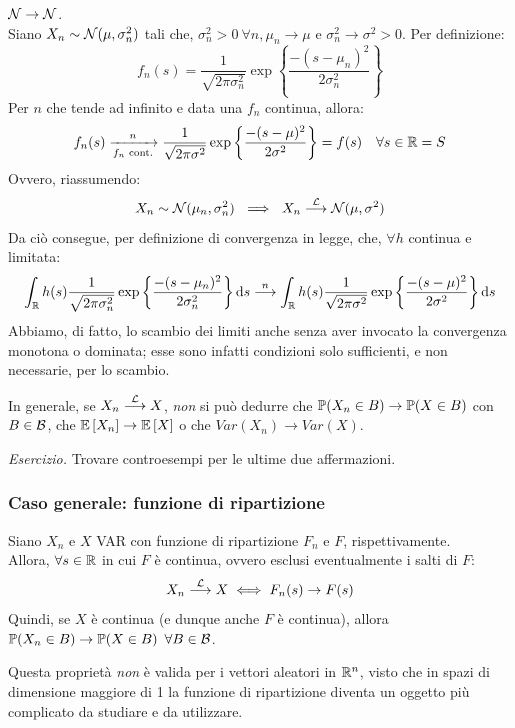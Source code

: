 \medskip
\begin{ese}
  $\mathcal N \to \mathcal N$. \\
  Siano $X_n \sim \mathcal N(\mu,\sigma_n^2)$ tali che, $\sigma_n^2 > 0 \ \forall n, \mu_n \to \mu$ e $\sigma_n^2 \to \sigma^2 > 0$. Per definizione:
  $$f_n(s) = \frac 1 {\sqrt{2 \pi \sigma_n^2}} \exp\left\{ \frac{-(s-\mu_n)^2}{2\sigma_n^2} \right\}$$
  Per $n$ che tende ad infinito e data una $f_n$ continua, allora:
  $$f_n(s) \xrightarrow[f_n \text{ cont.}]{n} \frac 1 {\sqrt{2 \pi \sigma^2}} \exp\left\{ \frac{-(s-\mu)^2}{2\sigma^2} \right\} = f(s) \quad \forall s \in \mathbb R = S$$
  Ovvero, riassumendo:
  $$ X_n \sim \mathcal N(\mu_n,\sigma_n^2) \ \implies \ X_n \stackrel{\mathcal L}{\longrightarrow} \mathcal N(\mu,\sigma^2) $$
  Da ciò consegue, per definizione di convergenza in legge, che, $\forall h$ continua e limitata:
  $$ \int_\mathbb R h(s) \frac 1 {\sqrt{2 \pi \sigma_n^2}} \exp\left\{ \frac{-(s-\mu_n)^2}{2\sigma_n^2} \right\} \mathrm d s \overset{n}{\longrightarrow}
  \int_\mathbb R h(s)  \frac 1 {\sqrt{2 \pi \sigma^2}} \exp\left\{ \frac{-(s-\mu)^2}{2\sigma^2} \right\} \mathrm d s$$
  Abbiamo, di fatto, lo scambio dei limiti anche senza aver invocato la convergenza monotona o dominata; esse sono infatti condizioni solo sufficienti, e non necessarie, per lo scambio.
\end{ese}

In generale, se $X_n \stackrel{\mathcal L}{\longrightarrow} X$, \emph{non} si può dedurre che $\mathbb P(X_n \in B) \to \mathbb P(X \in B)$ con $B \in \mathcal B$, che $\mathbb E \left[ X_n \right] \to \mathbb E \left[ X \right]$ o che $Var(X_n) \to Var(X)$.


\textit{Esercizio.} Trovare controesempi per le ultime due affermazioni.

\subsubsection{Caso generale: funzione di ripartizione}
\begin{teob}[\JPTh{18.4}]
  Siano $X_n$ e $X$ VAR con funzione di ripartizione $F_n$ e $F$, rispettivamente. \\
  Allora, $\forall s \in \mathbb R$ in cui $F$ è continua, ovvero esclusi eventualmente i salti di $F$:
  $$ X_n \stackrel{\mathcal L}{\longrightarrow} X \iff F_n(s) \to F(s)$$
  Quindi, se $X$ è continua (e dunque anche $F$ è continua), allora $\mathbb P(X_n \in B) \to \mathbb P(X \in B) \enspace \forall B \in \mathcal B$.
\end{teob}
Questa proprietà \emph{non} è valida per i vettori aleatori in $\mathbb R^n$, visto che in spazi di dimensione maggiore di 1 la funzione di ripartizione diventa un oggetto più complicato da studiare e da utilizzare.

